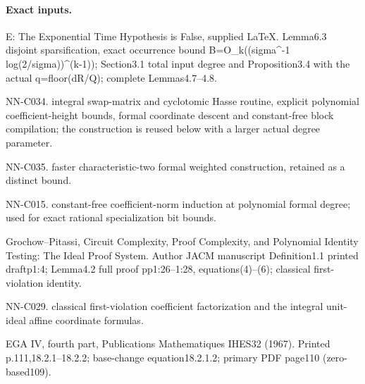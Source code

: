 \paragraph{Exact inputs.}
E: The Exponential Time Hypothesis is False, supplied LaTeX. Lemma6.3 disjoint sparsification, exact occurrence bound B=O\_k((sigma\textasciicircum{}-1 log(2/sigma))\textasciicircum{}(k-1)); Section3.1 total input degree and Proposition3.4 with the actual q=floor(dR/Q); complete Lemmas4.7--4.8.

NN-C034. integral swap-matrix and cyclotomic Hasse routine, explicit polynomial coefficient-height bounds, formal coordinate descent and constant-free block compilation; the construction is reused below with a larger actual degree parameter.

NN-C035. faster characteristic-two formal weighted construction, retained as a distinct bound.

NN-C015. constant-free coefficient-norm induction at polynomial formal degree; used for exact rational specialization bit bounds.

Grochow--Pitassi, Circuit Complexity, Proof Complexity, and Polynomial Identity Testing: The Ideal Proof System. Author JACM manuscript Definition1.1 printed draftp1:4; Lemma4.2 full proof pp1:26--1:28, equations(4)--(6); classical first-violation identity.

NN-C029. classical first-violation coefficient factorization and the integral unit-ideal affine coordinate formulas.

EGA IV, fourth part, Publications Mathematiques IHES32 (1967). Printed p.111,18.2.1--18.2.2; base-change equation18.2.1.2; primary PDF page110 (zero-based109).

